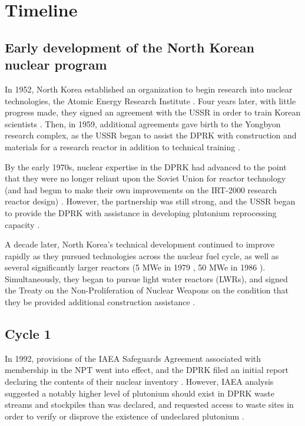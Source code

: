 \section{Timeline}
\subsection{Early development of the North Korean nuclear program}
In 1952, North Korea established an organization to begin research into nuclear technologies, the Atomic Energy Research Institute \cite{ntiAERI}. Four years later, with little progress made, they signed an agreement with the USSR in order to train Korean scientists \cite{nti15}. Then, in 1959, additional agreements gave birth to the Yongbyon research complex, as the USSR began to assist the DPRK with construction and materials for a research reactor in addition to technical training \cite{nti15}.

By the early 1970s, nuclear expertise in the DPRK had advanced to the point that they were no longer reliant upon the Soviet Union for reactor technology (and had begun to make their own improvements on the IRT-2000 research reactor design) \cite{nti15}. However, the partnership was still strong, and the USSR began to provide the DPRK with assistance in developing plutonium reprocessing capacity \cite{nti15}.

A decade later, North Korea's technical development continued to improve rapidly as they pursued technologies across the nuclear fuel cycle, as well as several significantly larger reactors (5 MWe in 1979 \cite{ntiYongbyon}, 50 MWe in 1986 \cite{ntiYongbyon2}). Simultaneously, they began to pursue light water reactors (LWRs), and signed the Treaty on the Non-Proliferation of Nuclear Weapons on the condition that they be provided additional construction assistance \cite{nti15}.   

\subsection{Cycle 1}

In 1992, provisions of the IAEA Safeguards Agreement associated with membership in the NPT went into effect, and the DPRK filed an initial report declaring the contents of their nuclear inventory \cite{iaea92}. However, IAEA analysis suggested a notably higher level of plutonium should exist in DPRK waste streams and stockpiles than was declared, and requested access to waste sites in order to verify or disprove the existence of undeclared plutonium \cite{iaea09}. 

